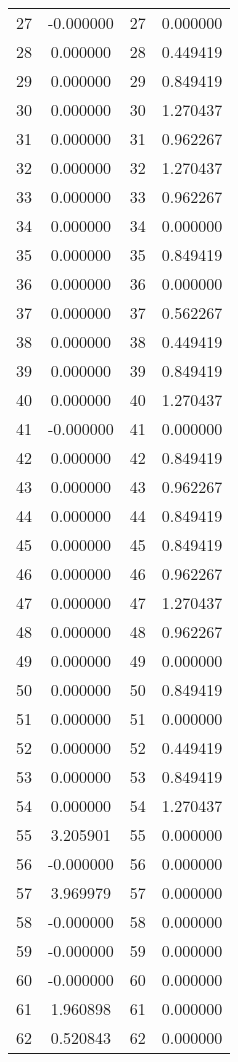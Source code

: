 \documentclass[12pt]{article}
\begin{document}
\begin{longtable}{@{}cccc@{}}
27 & -0.000000 & 27 & 0.000000 \\
28 & 0.000000 & 28 & 0.449419 \\
29 & 0.000000 & 29 & 0.849419 \\
30 & 0.000000 & 30 & 1.270437 \\
31 & 0.000000 & 31 & 0.962267 \\
32 & 0.000000 & 32 & 1.270437 \\
33 & 0.000000 & 33 & 0.962267 \\
34 & 0.000000 & 34 & 0.000000 \\
35 & 0.000000 & 35 & 0.849419 \\
36 & 0.000000 & 36 & 0.000000 \\
37 & 0.000000 & 37 & 0.562267 \\
38 & 0.000000 & 38 & 0.449419 \\
39 & 0.000000 & 39 & 0.849419 \\
40 & 0.000000 & 40 & 1.270437 \\
41 & -0.000000 & 41 & 0.000000 \\
42 & 0.000000 & 42 & 0.849419 \\
43 & 0.000000 & 43 & 0.962267 \\
44 & 0.000000 & 44 & 0.849419 \\
45 & 0.000000 & 45 & 0.849419 \\
46 & 0.000000 & 46 & 0.962267 \\
47 & 0.000000 & 47 & 1.270437 \\
48 & 0.000000 & 48 & 0.962267 \\
49 & 0.000000 & 49 & 0.000000 \\
50 & 0.000000 & 50 & 0.849419 \\
51 & 0.000000 & 51 & 0.000000 \\
52 & 0.000000 & 52 & 0.449419 \\
53 & 0.000000 & 53 & 0.849419 \\
54 & 0.000000 & 54 & 1.270437 \\
55 & 3.205901 & 55 & 0.000000 \\
56 & -0.000000 & 56 & 0.000000 \\
57 & 3.969979 & 57 & 0.000000 \\
58 & -0.000000 & 58 & 0.000000 \\
59 & -0.000000 & 59 & 0.000000 \\
60 & -0.000000 & 60 & 0.000000 \\
61 & 1.960898 & 61 & 0.000000 \\
62 & 0.520843 & 62 & 0.000000 \\

\end{longtable}
\end{document}
